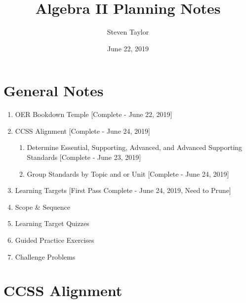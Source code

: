 \documentclass{article}
\title{Algebra II Planning Notes}
\author{Steven Taylor}
\date{June 22, 2019}
\begin{document}
\maketitle
\section*{General Notes}
\begin{enumerate}
    \item OER Bookdown Temple [Complete - June 22, 2019]
    \item CCSS Alignment [Complete  - June 24, 2019]
    \begin{enumerate}
    	\item Determine Essential, Supporting, Advanced, and Advanced Supporting Standards [Complete - June 23, 2019]
    	\item Group Standards by Topic and or Unit [Complete - June 24, 2019]
    \end{enumerate}
    \item Learning Targets [First Pass Complete - June 24, 2019, Need to Prune]
    \item Scope \& Sequence
    \item Learning Target Quizzes
    \item Guided Practice Exercises
    \item Challenge Problems
\end{enumerate}
\section*{CCSS Alignment}
\end{document}
